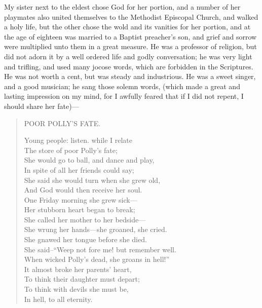 \documentclass{article}
\renewcommand\footnote[1]{} %
\begin{document}
My sister next to the eldest\footnote{Maria} chose God for her portion, and a number of her playmates also united themselves to the Methodist Episcopal Church, and walked a holy life, but the other\footnote{Harriet} chose the wold and its vanities for her portion, and at the age of eighteen\footnote{in the year 1814} was married to a Baptist preacher's son\footnote{Joseph Perkins}, and grief and sorrow were multiplied unto them in a great measure.
He was a professor of religion, but did not adorn it by a well ordered life and godly conversation; he was very light and trifling, and used many jocose words, which are forbidden in the Scriptures.
He was not worth a cent, but was steady and industrious.
He was a sweet singer, and a good musician; he sang those solemn words, (which made a great and lasting impression on my mind, for I awfully feared that if I did not repent, I should share her fate)---
\begin{quote}
    \begin{center}
        POOR POLLY'S FATE.
    \end{center}
    Young people: listen. while I relate\\
    The store of poor Polly's fate;\\
    She would go to ball, and dance and play,\\
    In spite of all her friends could say;\\
    She said she would turn when she grew old,\\
    And God would then receive her soul.\\
    One Friday morning she grew sick---\\
    Her stubborn heart began to break;\\
    She called her mother to her bedside---\\
    She wrung her hands---she groaned, she cried.\\
    She gnawed her tongue before she died.\\
    She said--``Weep not fore me! but remember well.\\
    When wicked Polly's dead, she groans in hell!''\\
    It almost broke her parents' heart,\\
    To think their daughter must depart;\\
    To think with devils she must be,\\
    In hell, to all eternity.\\
\end{quote}
\end{document}
